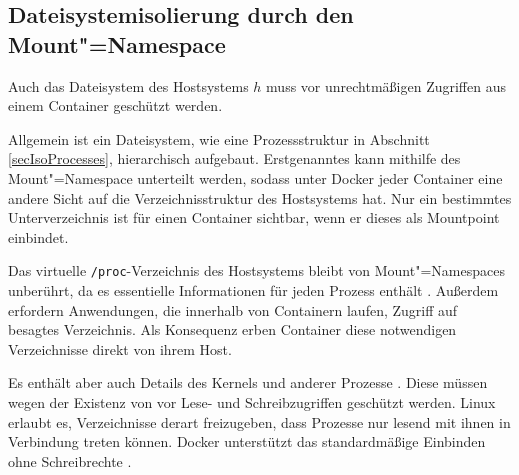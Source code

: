 \documentclass[../main.tex]{subfiles}
\begin{document}

    \subsection{Dateisystemisolierung durch den Mount"=Namespace}
			Auch das Dateisystem des Hostsystems \(h\) muss vor unrechtmäßigen Zugriffen aus einem Container \cbroken{} geschützt werden.

			Allgemein ist ein Dateisystem, wie eine Prozessstruktur in Abschnitt \ref{secIsoProcesses}, hierarchisch aufgebaut. Erstgenanntes kann mithilfe des Mount"=Namespace unterteilt werden, sodass unter Docker jeder Container eine andere Sicht auf die Verzeichnisstruktur des Hostsystems hat. Nur ein bestimmtes Unterverzeichnis ist für einen Container sichtbar, wenn er dieses als Mountpoint einbindet.

			Das virtuelle \texttt{/proc}-Verzeichnis des Hostsystems bleibt von Mount"=Namespaces unberührt, da es essentielle Informationen für jeden Prozess enthält \cite{creatingContainers}\cite{secPart1}. Außerdem erfordern Anwendungen, die innerhalb von Containern laufen, Zugriff auf besagtes Verzeichnis. Als Konsequenz erben Container diese notwendigen Verzeichnisse direkt von ihrem Host.

			Es enthält aber auch Details des Kernels und anderer Prozesse \cite{proc}. Diese müssen wegen der Existenz von \cbroken{} vor Lese- und Schreibzugriffen geschützt werden. Linux erlaubt es, Verzeichnisse derart freizugeben, dass Prozesse nur lesend mit ihnen in Verbindung treten können. Docker unterstützt das standardmäßige Einbinden ohne Schreibrechte \cite[S.4f.]{dockerSecIntro}.




\end{document}

